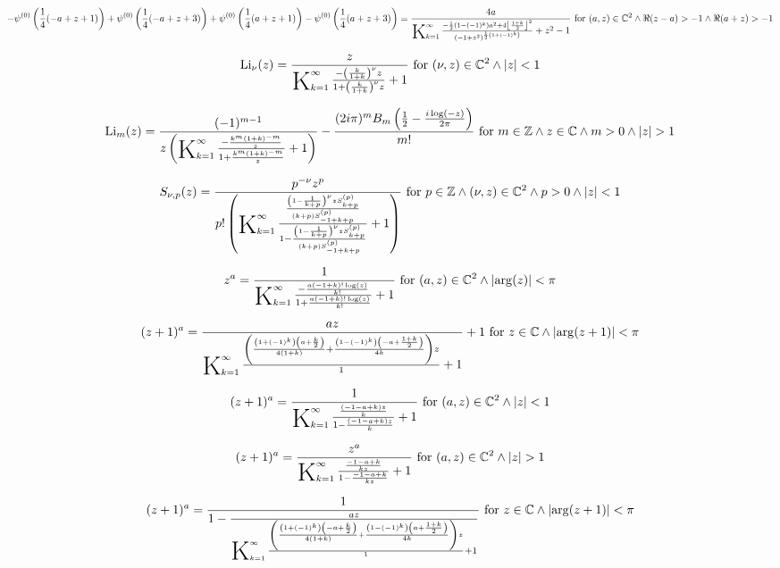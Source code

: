 \documentclass{article}
\newcommand{\bigK}{\mathop{\raisebox{-5pt}{\huge K}}}
\begin{document}
\[-\psi ^{(0)}\left(\frac{1}{4} (-a+z+1)\right)+\psi ^{(0)}\left(\frac{1}{4} (-a+z+3)\right)+\psi ^{(0)}\left(\frac{1}{4} (a+z+1)\right)-\psi ^{(0)}\left(\frac{1}{4} (a+z+3)\right)=\frac{4 a}{\bigK_{k=1}^{\infty}\frac{-\frac{1}{2} \left(1-(-1)^k\right) a^2+4 \left\lfloor \frac{1+k}{2}\right\rfloor ^2}{\left(-1+z^2\right)^{\frac{1}{2} \left(1+(-1)^k\right)}}+z^2-1}\text{ for }(a,z)\in \mathbb{C}^2\land \Re(z-a)>-1\land \Re(a+z)>-1\] 

\[\text{Li}_{\nu }(z)=\frac{z}{\bigK_{k=1}^{\infty}\frac{-\left(\frac{k}{1+k}\right)^{\nu } z}{1+\left(\frac{k}{1+k}\right)^{\nu } z}+1}\text{ for }(\nu ,z)\in \mathbb{C}^2\land \left| z\right| <1\] 

\[\text{Li}_m(z)=\frac{(-1)^{m-1}}{z \left(\bigK_{k=1}^{\infty}\frac{-\frac{k^m (1+k)^{-m}}{z}}{1+\frac{k^m (1+k)^{-m}}{z}}+1\right)}-\frac{(2 i \pi )^m B_m\left(\frac{1}{2}-\frac{i \log (-z)}{2 \pi }\right)}{m!}\text{ for }m\in \mathbb{Z}\land z\in \mathbb{C}\land m>0\land \left| z\right| >1\] 

\[S_{\nu ,p}(z)=\frac{p^{-\nu } z^p}{p! \left(\bigK_{k=1}^{\infty}\frac{\frac{\left(1-\frac{1}{k+p}\right)^{\nu } z S_{k+p}^{(p)}}{(k+p) S_{-1+k+p}^{(p)}}}{1-\frac{\left(1-\frac{1}{k+p}\right)^{\nu } z S_{k+p}^{(p)}}{(k+p) S_{-1+k+p}^{(p)}}}+1\right)}\text{ for }p\in \mathbb{Z}\land (\nu ,z)\in \mathbb{C}^2\land p>0\land \left| z\right| <1\] 

\[z^a=\frac{1}{\bigK_{k=1}^{\infty}\frac{-\frac{a (-1+k)! \log (z)}{k!}}{1+\frac{a (-1+k)! \log (z)}{k!}}+1}\text{ for }(a,z)\in \mathbb{C}^2\land \left| \arg (z)\right| <\pi\] 

\[(z+1)^a=\frac{a z}{\bigK_{k=1}^{\infty}\frac{\left(\frac{\left(1+(-1)^k\right) \left(a+\frac{k}{2}\right)}{4 (1+k)}+\frac{\left(1-(-1)^k\right) \left(-a+\frac{1+k}{2}\right)}{4 k}\right) z}{1}+1}+1\text{ for }z\in \mathbb{C}\land \left| \arg (z+1)\right| <\pi\] 

\[(z+1)^a=\frac{1}{\bigK_{k=1}^{\infty}\frac{\frac{(-1-a+k) z}{k}}{1-\frac{(-1-a+k) z}{k}}+1}\text{ for }(a,z)\in \mathbb{C}^2\land \left| z\right| <1\] 

\[(z+1)^a=\frac{z^a}{\bigK_{k=1}^{\infty}\frac{\frac{-1-a+k}{k z}}{1-\frac{-1-a+k}{k z}}+1}\text{ for }(a,z)\in \mathbb{C}^2\land \left| z\right| >1\] 

\[(z+1)^a=\frac{1}{1-\frac{a z}{\bigK_{k=1}^{\infty}\frac{\left(\frac{\left(1+(-1)^k\right) \left(-a+\frac{k}{2}\right)}{4 (1+k)}+\frac{\left(1-(-1)^k\right) \left(a+\frac{1+k}{2}\right)}{4 k}\right) z}{1}+1}}\text{ for }z\in \mathbb{C}\land \left| \arg (z+1)\right| <\pi\] 
\end{document}
